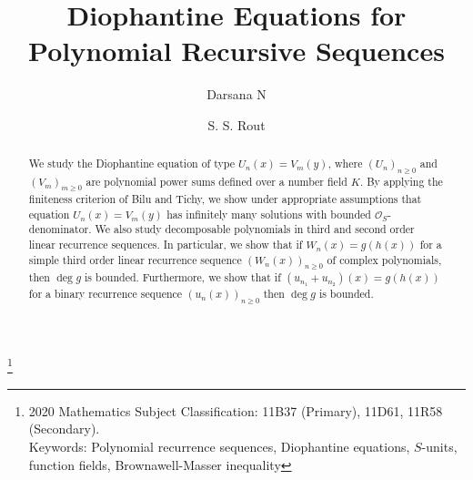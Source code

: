 \documentclass[12pt]{amsart}
\begin{document}
	\title[Diophantine Equations for Polynomial Recursive Sequences]{Diophantine Equations for Polynomial Recursive Sequences}
	
	\author[Darsana]{Darsana N}
	\address{Darsana N, Department of Mathematics, National Institute of Technology Calicut, 
		Kozhikode-673 601, India.}
	
	
	
	\author[Rout]{S. S. Rout}
	\address{Sudhansu Sekhar Rout, Department of Mathematics, National Institute of Technology Calicut, 
		Kozhikode-673 601, India.}
	
	
	
	
	\dedicatory{}
	\thanks{2020 Mathematics Subject Classification: 11B37 (Primary), 11D61, 11R58 (Secondary).\\
		Keywords: Polynomial recurrence sequences, Diophantine equations, $S$-units, function fields, Brownawell-Masser inequality}
	\begin{abstract}
        We study the Diophantine equation of type $U_n(x)=V_m(y)$, where $(U_n)_{n\geq 0}$ and $(V_m)_{m\geq 0}$ are polynomial power sums defined over a number field $K$. By applying the finiteness criterion of Bilu and Tichy, we show under appropriate assumptions that equation $U_n(x)=V_m(y)$ has infinitely many solutions with bounded $\mathcal{O}_S$-denominator. We also study decomposable polynomials in third and second order linear recurrence sequences. In particular, we show that if $W_n(x)=g(h(x))$ for a simple third order linear recurrence sequence $(W_n(x))_{n\geq 0}$ of complex polynomials, then $\deg g$ is bounded. Furthermore, we show that if $(u_{n_1}+u_{n_2})(x)=g(h(x))$ for a binary recurrence sequence $(u_n(x))_{n\geq 0}$ then $\deg g$ is bounded.
	\end{abstract}
	\maketitle
	\pagestyle{headings}
	
	
\end{document}
